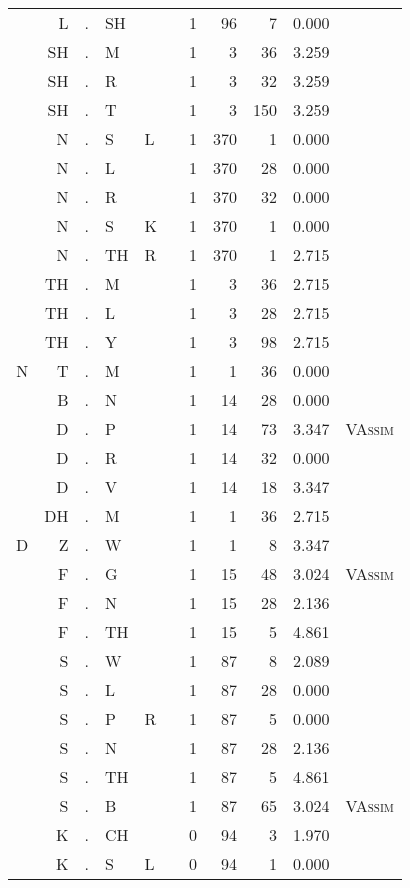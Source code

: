 \begin{longtable}{r@{ } r@{ } c@{ } l@{ } l@{ } l@{ } r r r r l }
 & L & . & SH &  &  & 1 & 96 & 7 & 0.000 &  \\
 & SH & . & M &  &  & 1 & 3 & 36 & 3.259 &  \\
 & SH & . & R &  &  & 1 & 3 & 32 & 3.259 &  \\
 & SH & . & T &  &  & 1 & 3 & 150 & 3.259 &  \\
 & N & . & S & L &  & 1 & 370 & 1 & 0.000 &  \\
 & N & . & L &  &  & 1 & 370 & 28 & 0.000 &  \\
 & N & . & R &  &  & 1 & 370 & 32 & 0.000 &  \\
 & N & . & S & K &  & 1 & 370 & 1 & 0.000 &  \\
 & N & . & TH & R &  & 1 & 370 & 1 & 2.715 &  \\
 & TH & . & M &  &  & 1 & 3 & 36 & 2.715 &  \\
 & TH & . & L &  &  & 1 & 3 & 28 & 2.715 &  \\
 & TH & . & Y &  &  & 1 & 3 & 98 & 2.715 &  \\
N & T & . & M &  &  & 1 & 1 & 36 & 0.000 &  \\
 & B & . & N &  &  & 1 & 14 & 28 & 0.000 &  \\
 & D & . & P &  &  & 1 & 14 & 73 & 3.347 & \textsc{VAssim} \\
 & D & . & R &  &  & 1 & 14 & 32 & 0.000 &  \\
 & D & . & V &  &  & 1 & 14 & 18 & 3.347 &  \\
 & DH & . & M &  &  & 1 & 1 & 36 & 2.715 &  \\
D & Z & . & W &  &  & 1 & 1 & 8 & 3.347 &  \\
 & F & . & G &  &  & 1 & 15 & 48 & 3.024 & \textsc{VAssim} \\
 & F & . & N &  &  & 1 & 15 & 28 & 2.136 &  \\
 & F & . & TH &  &  & 1 & 15 & 5 & 4.861 &  \\
 & S & . & W &  &  & 1 & 87 & 8 & 2.089 &  \\
 & S & . & L &  &  & 1 & 87 & 28 & 0.000 &  \\
 & S & . & P & R &  & 1 & 87 & 5 & 0.000 &  \\
 & S & . & N &  &  & 1 & 87 & 28 & 2.136 &  \\
 & S & . & TH &  &  & 1 & 87 & 5 & 4.861 &  \\
 & S & . & B &  &  & 1 & 87 & 65 & 3.024 & \textsc{VAssim} \\
 & K & . & CH &  &  & 0 & 94 & 3 & 1.970 &  \\
 & K & . & S & L &  & 0 & 94 & 1 & 0.000 &  \\

\end{longtable}
